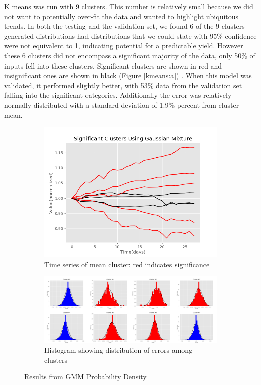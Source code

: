 \documentclass{article}
\begin{document}
K means was run with 9 clusters. This number is relatively small because we did not want to potentially over-fit the data and wanted to highlight ubiquitous trends. In both the testing and the validation set, we found 6 of the 9 clusters generated distributions had distributions that we could state with 95\% confidence were not equivalent to 1, indicating potential for a predictable yield. However these 6 clusters did not encompass a significant majority of the data, only 50\% of inputs fell into these clusters. Significant clusters are shown in red and insignificant ones are shown in black (Figure \ref{kmeans:a}) . When this model was validated, it performed slightly better, with 53\% data from the validation set falling into the significant categories. Additionally the error was relatively normally distributed with a standard deviation of 1.9\% percent from cluster mean. 
\begin{figure}[h]
\begin{subfigure}{.35\textwidth}
  \centering
  \includegraphics[width=\linewidth]{sigfig.png}
  \caption{Time series of mean cluster: red indicates significance}
  \label{gmm:a}
\end{subfigure}%
\begin{subfigure}{.65\textwidth}
  \centering
  \includegraphics[width=\linewidth]{hists.png}
  \caption{Histogram showing distribution of errors among clusters}
  \label{gmm:b}
\end{subfigure}
\caption{Results from GMM Probability Density}
\label{gmm}
\end{figure}
\end{document}
